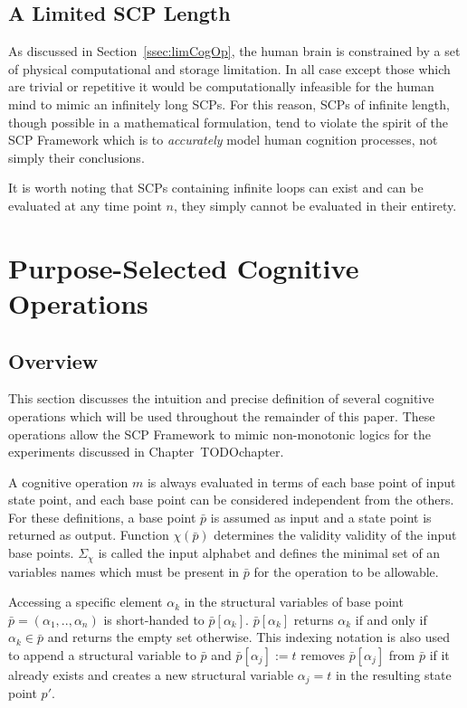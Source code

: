 \subsection{A Limited SCP Length}
As discussed in Section~\ref{ssec:limCogOp}, the human brain is constrained by a set of physical computational and storage limitation. In all case except those which are trivial or repetitive it would be computationally infeasible for the human mind to mimic an infinitely long SCPs. For this reason, SCPs of infinite length, though possible in a mathematical formulation, tend to violate the spirit of the SCP Framework which is to \textit{accurately} model human cognition processes, not simply their conclusions.

It is worth noting that SCPs containing infinite loops can exist and can be evaluated at any time point $n$, they simply cannot be evaluated in their entirety.

\section{Purpose-Selected Cognitive Operations}
\subsection{Overview}

This section discusses the intuition and precise definition of several cognitive operations which will be used throughout the remainder of this paper. These operations allow the SCP Framework to mimic non-monotonic logics for the experiments discussed in Chapter~TODOchapter.

A cognitive operation $m$ is always evaluated in terms of each base point of input state point, and each base point can be considered independent from the others. For these definitions, a base point $\bar{p}$ is assumed as input and a state point is returned as output. Function $\chi(\bar{p})$ determines the validity validity of the input base points. $\Sigma_\chi$ is called the input alphabet and defines the minimal set of an variables names which must be present in $\bar{p}$ for the operation to be allowable.

Accessing a specific element $\alpha_k$ in the structural variables of base point $\bar{p}=(\alpha_1,..,\alpha_n)$ is short-handed to $\bar{p}[\alpha_k]$. $\bar{p}[\alpha_k]$ returns $\alpha_k$ if and only if $\alpha_k \in \bar{p}$ and returns the empty set otherwise. This indexing notation is also used to append a structural variable to $\bar{p}$ and $\bar{p}[\alpha_j]:=t$ removes $\bar{p}[\alpha_j]$ from $\bar{p}$ if it already exists and creates a new structural variable $\alpha_j=t$ in the resulting state point $p'$.

